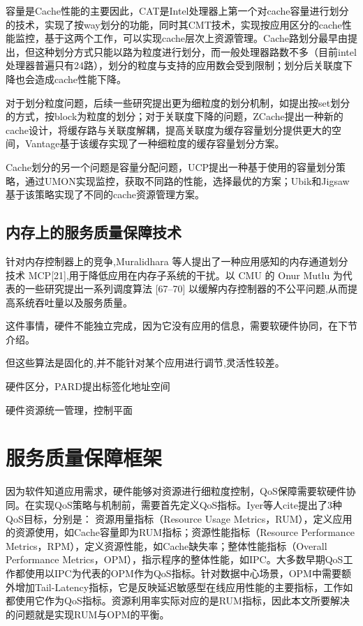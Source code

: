 容量是Cache性能的主要因此，CAT是Intel处理器上第一个对cache容量进行划分的技术，实现了按way划分的功能，同时其CMT技术，实现按应用区分的cache性能监控，基于这两个工作，可以实现cache层次上资源管理。Cache路划分最早由\cite{}提出，但这种划分方式只能以路为粒度进行划分，而一般处理器路数不多（目前intel处理器普遍只有24路），划分的粒度与支持的应用数会受到限制；划分后关联度下降也会造成cache性能下降。

对于划分粒度问题，后续一些研究提出更为细粒度的划分机制，如\cite{}提出按set划分的方式，\cite{}按block为粒度的划分；对于关联度下降的问题，ZCache\cite{}提出一种新的cache设计，将缓存路与关联度解耦，提高关联度为缓存容量划分提供更大的空间，Vantage\cite{}基于该缓存实现了一种细粒度的缓存容量划分方案。

Cache划分的另一个问题是容量分配问题，UCP提出一种基于使用的容量划分策略，通过UMON实现监控，获取不同路的性能，选择最优的方案；Ubik和Jigsaw基于该策略实现了不同的cache资源管理方案。

\subsection{内存上的服务质量保障技术}

针对内存控制器上的竞争,Muralidhara 等人提出了一种应用感知的内存通道划分技术 MCP[21],用于降低应用在内存子系统的干扰。以 CMU 的 Onur Mutlu 为代表的一些研究提出一系列调度算法 [67–70] 以缓解内存控制器的不公平问题,从而提高系统吞吐量以及服务质量。


这件事情，硬件不能独立完成，因为它没有应用的信息，需要软硬件协同，在下节介绍。

但这些算法是固化的,并不能针对某个应用进行调节,灵活性较差。

硬件区分，PARD提出标签化地址空间

硬件资源统一管理，控制平面


\section{服务质量保障框架}

因为软件知道应用需求，硬件能够对资源进行细粒度控制，QoS保障需要软硬件协同。在实现QoS策略与机制前，需要首先定义QoS指标。Iyer等人cite{}提出了3种QoS目标，分别是： 资源用量指标（Resource Usage Metrics，RUM），定义应用的资源使用，如Cache容量即为RUM指标；资源性能指标（Resource Performance  Metrics，RPM），定义资源性能，如Cache缺失率；整体性能指标（Overall Performance Metrics，OPM），指示程序的整体性能，如IPC。大多数早期QoS工作\cite{}都使用以IPC为代表的OPM作为QoS指标。针对数据中心场景，OPM中需要额外增加Tail-Latency指标，它是反映延迟敏感型在线应用性能的主要指标，工作如\cite{}都使用它作为QoS指标。资源利用率实际对应的是RUM指标，因此本文所要解决的问题就是实现RUM与OPM的平衡。

